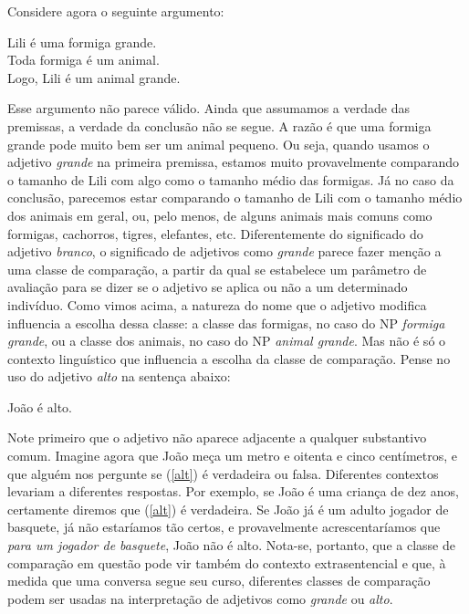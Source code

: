 Considere agora o seguinte argumento:

\begin{exe}
\ex\label{nueba} Lili é uma formiga grande.\\
Toda formiga é um animal.\\
Logo, Lili é um animal grande.
\end{exe}

\n Esse argumento não parece válido. Ainda que assumamos a verdade
das premissas, a verdade da conclusão não se segue. A razão é que
uma formiga grande pode muito bem ser um animal pequeno. Ou seja,
quando usamos o adjetivo \textit{grande} na primeira premissa,
estamos muito provavelmente comparando o tamanho de Lili com algo como o tamanho médio
das formigas. Já no caso da conclusão, parecemos estar comparando
o tamanho de Lili com o tamanho  médio dos animais em geral, ou,
pelo menos, de alguns animais mais comuns como formigas,
cachorros, tigres, elefantes, etc. Diferentemente do
significado do adjetivo \textit{branco}, o significado de
adjetivos como \textit{grande} parece fazer menção a uma classe de
comparação, a partir da qual se estabelece um parâmetro de
avaliação para se dizer se o adjetivo se aplica ou não a um
determinado indivíduo. Como vimos acima, a natureza do nome que o
adjetivo modifica influencia a escolha dessa classe: a classe das
formigas, no caso do NP \textit{formiga grande}, ou a classe dos
animais, no caso do NP \textit{animal grande}. Mas não é só o
contexto linguístico que influencia a escolha da classe de
comparação. Pense no uso do adjetivo \textit{alto} na sentença
abaixo:

\begin{exe}
\ex João é alto.\label{alt}
\end{exe}

\n Note primeiro que o adjetivo não aparece adjacente a qualquer substantivo comum. Imagine agora que João meça um metro e oitenta e cinco
centímetros, e que alguém nos pergunte se (\ref{alt}) é verdadeira
ou falsa. Diferentes contextos levariam a diferentes respostas.
Por exemplo, se João é uma criança de dez anos, certamente diremos
que (\ref{alt}) é verdadeira. Se João já é um adulto jogador de
basquete, já não estaríamos tão certos, e provavelmente
acrescentaríamos que \textit{para um jogador de basquete}, João não
é alto. Nota-se, portanto, que a classe de comparação em
questão pode vir também do contexto extrasentencial e que, à
medida que uma conversa segue seu curso, diferentes classes de
comparação podem ser usadas na interpretação de adjetivos como
\textit{grande} ou \textit{alto}.

